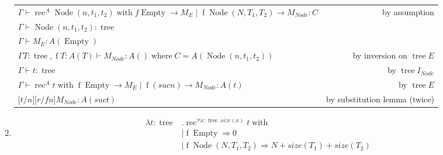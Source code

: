 \documentclass{article}
\newcommand{\proves}{\vdash}
\newcommand{\GV}{\Gamma \proves}
\DeclareMathOperator{\tree}{tree}
\DeclareMathOperator{\Empty}{Empty}
\DeclareMathOperator{\Node}{Node}
\DeclareMathOperator{\f}{f}
\DeclareMathOperator{\rec}{rec}
\DeclareMathOperator{\with}{with}
\DeclareMathOperator{\where}{where}
\begin{document}
\begin{enumerate}
\begin{tabular}{lr}
$ \GV \rec^A \Node(n,t_1,t_2) \with f \Empty \to M_E \mid \f \Node(N,T_1,T_2) \to M_{Node} : C$ & by assumption \\
$ \GV \Node(n,t_1,t_2) : \tree $ & \\
$ \GV M_E : A(\Empty)$ & \\
$ \Gamma T:\tree, \f T : A(T) \proves M_{Node} : A() \where C = A(\Node(n,t_1,t_2))$ & by inversion on $\tree E$ \\
$ \GV t : \tree$ & by $\tree I_{Node}$ \\
$ \GV \rec^A t \with \f \Empty \to M_E \mid \f (suc n) \to M_{Node} : A(t)$ & by $\tree E$ \\
${[}t/n{]}{[}r/f n{]}M_{Node} : A(suc t)$ & by substitution lemma (twice)
\end{tabular}


\item \begin{align*}
\lambda t : \tree &. \rec^{\forall x : \tree . size(x)} t \with \\
&\mid \f \Empty 	\Rightarrow 0 \\
&\mid \f \Node(N,T_1,T_2) \Rightarrow N + size(T_1) + size(T_2)
\end{align*}

\end{enumerate}
\end{document}
